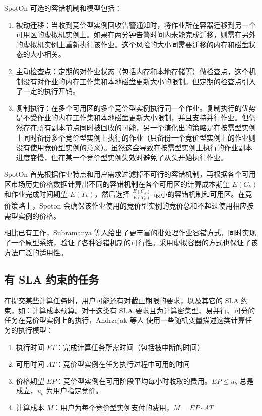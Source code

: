 SpotOn 可选的容错机制和模型包括：
\begin{enumerate}
\item 被动迁移：当收到竞价型实例回收告警通知时，将作业所在容器迁移到另一个可用区的虚拟机实例上。如果在两分钟告警时间内未能完成迁移，则需在另外的虚拟机实例上重新执行该作业。这个风险的大小同需要迁移的内存和磁盘状态的大小相关。
\item 主动检查点：定期的对作业状态（包括内存和本地存储等）做检查点，这个机制没有对作业的内存工作集和本地磁盘更新大小的限制。但定期的检查点引入了一定的执行开销。
\item 复制执行：在多个可用区的多个竞价型实例执行同一个作业。复制执行的优势是不受作业的内存工作集和本地磁盘更新大小限制，并且支持并行作业。但仍然存在所有副本节点同时被回收的可能，另一个演化出的策略是在按需型实例上同时备份多个竞价型实例上执行的作业（只备份一个竞价型实例上的作业则没有使用竞价型实例的意义）。虽然这会导致在按需型实例上执行的作业副本进度变慢，但在某一个竞价型实例失效时避免了从头开始执行作业。
\end{enumerate}

SpotOn 首先根据作业特点和用户需求过滤掉不可行的容错机制，再根据各个可用区市场历史价格数据计算出不同的容错机制在各个可用区的计算成本期望 $E(C_k)$ 和作业完成时间期望 $E(T_k)$，然后选择 $\frac{E(C_k)}{E(T_k)}$ 最小的容错机制和可用区。在竞价策略上，Spoton 会确保该作业使用的竞价型实例的竞价总和不超过使用相应按需型实例的价格。

相比已有工作，Subramanya 等人给出了更丰富的批处理作业容错方式，同时实现了一个原型系统，验证了各种容错机制的可行性。采用虚拟容器的方式也保证了该方法广泛的适用性。

\subsection{有 SLA 约束的任务}
在提交某些计算任务时，用户可能还有对截止期限的要求，以及其它的 SLA 约束，如：计算成本预算。对于这类有 SLA 要求且为计算密集型、易并行、可分的任务在竞价型实例上的执行，Andrzejak 等人 \cite{Andrzejak:2010:DMC:1906481.1906533} 使用一些随机变量描述这类计算任务的执行模型：
\begin{enumerate}
\item 执行时间 $ET$：完成计算任务所需时间（包括被中断的时间）
\item 可用时间 $AT$：竞价型实例在任务执行过程中可用的时间
\item 价格期望 $EP$：竞价型实例在可用阶段平均每小时收取的费用。$EP \leq u_b$ 总是成立，$u_b$ 为用户指定竞价。
\item 计算成本 $M$：用户为每个竞价型实例支付的费用，$M = EP \cdot AT$
\end{enumerate}

